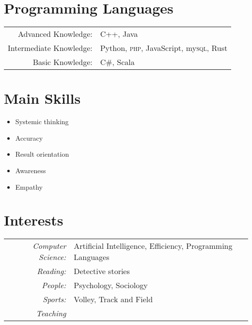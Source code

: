 \documentclass[a4paper,10pt]{article}
\begin{document}
\section{Programming Languages}
\begin{tabular}{rl}
 Advanced Knowledge:& C++, Java \\
 Intermediate Knowledge:& Python, \textsc{php}, JavaScript, my\textsc{sql}, Rust \\
 Basic Knowledge:& C\#, Scala \\
\end{tabular}

\section{Main Skills}
\begin{itemize}
	\itemsep -0.5em 
	\item Systemic thinking
	\item Accuracy
	\item Result orientation
	\item Awareness
	\item Empathy
\end{itemize}
\section{Interests}
\begin{tabular}{rl}
	\textit{Computer Science:} & Artificial Intelligence, Efficiency, Programming Languages \\
	\textit{Reading:} & Detective stories \\
	\textit{People:} & Psychology, Sociology \\
	\textit{Sports:} & Volley, Track and Field \\
	\textit{Teaching} & \\

\end{tabular} \newline
\end{document}
